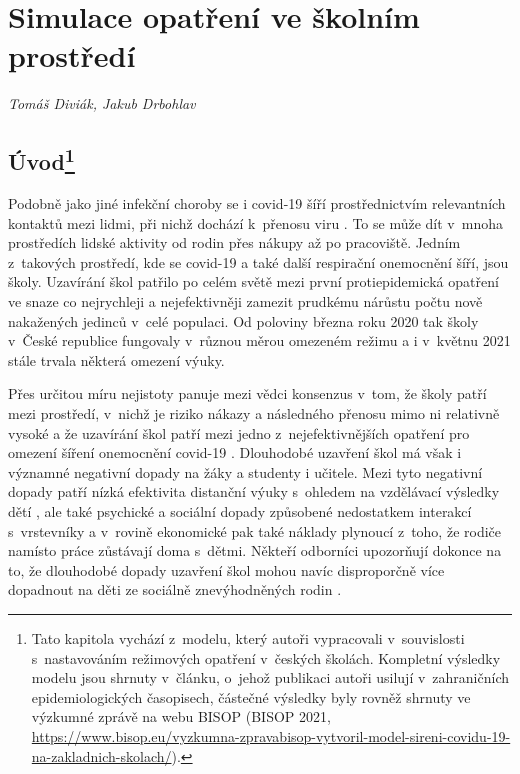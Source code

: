 
\chapter{Simulace opatření ve školním prostředí}\label{Skoly}

\textit{Tomáš Diviák, Jakub Drbohlav}
\vspace{15mm}

\section*{Úvod\footnote{Tato kapitola vychází z~modelu, který autoři vypracovali v~souvislosti s~nastavováním režimových opatření v~českých školách. Kompletní výsledky modelu jsou shrnuty v~článku, o~jehož publikaci autoři usilují v~zahraničních epidemiologických časopisech, částečné výsledky byly rovněž shrnuty ve výzkumné zprávě na webu BISOP (BISOP 2021, \url{https://www.bisop.eu/vyzkumna-zpravabisop-vytvoril-model-sireni-covidu-19-na-zakladnich-skolach/}).}}

Podobně jako jiné infekční choroby se i covid-19 šíří prostřednictvím relevantních kontaktů mezi lidmi, při nichž dochází k~přenosu viru \cite{pg:kucharski2020, vespignani2020modelling}. To se může dít v~mnoha prostředích lidské aktivity od rodin přes nákupy až po pracoviště. Jedním z~takových prostředí, kde se covid-19 a také další respirační onemocnění šíří, jsou školy. Uzavírání škol patřilo po celém světě mezi první protiepidemická opatření ve snaze co nejrychleji a nejefektivněji zamezit prudkému nárůstu počtu nově nakažených jedinců v~celé populaci. Od poloviny března roku 2020 tak školy v~České republice fungovaly v~různou měrou omezeném režimu a i v~květnu 2021 stále trvala některá omezení výuky.

Přes určitou míru nejistoty panuje mezi vědci konsenzus v~tom, že školy patří mezi prostředí, v~nichž je riziko nákazy a následného přenosu mimo ni relativně vysoké a že uzavírání škol patří mezi jedno z~nejefektivnějších opatření pro omezení šíření onemocnění covid-19 \cite{Brauner_etal2020, lessler2021household, Haug_etal2020}. Dlouhodobé uzavření škol má však i významné negativní dopady na žáky a studenty i učitele. Mezi tyto negativní dopady patří nízká efektivita distanční výuky s~ohledem na vzdělávací výsledky dětí \cite{engzell2021learning}, ale také psychické a sociální dopady způsobené nedostatkem interakcí s~vrstevníky \cite{bignardi2020longitudinal, ravens2021impact} a v~rovině ekonomické pak také náklady plynoucí z~toho, že rodiče namísto práce zůstávají doma s~dětmi. Někteří odborníci upozorňují dokonce na to, že dlouhodobé dopady uzavření škol mohou navíc disproporčně více dopadnout na děti ze sociálně znevýhodněných rodin \cite{di2020likely}.

